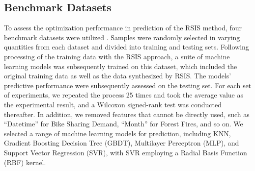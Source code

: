 \documentclass[lettersize,journal]{IEEEtran}
\begin{document}
\subsection{Benchmark Datasets}
To assess the optimization performance in prediction of the RSIS 
method, four benchmark datasets were utilized \cite{bib84,bib85,bib86,bib87}. Samples 
were randomly selected in varying quantities from each dataset 
and divided into training and testing sets. Following 
processing of the training data with the RSIS approach, a 
suite of machine learning models was subsequently trained on 
this dataset, which included the original training data as well 
as the data synthesized by RSIS. The models' predictive performance were subsequently 
assessed on the testing set. For each set of experiments, we 
repeated the process 25 times and took the average value as the 
experimental result, and a Wilcoxon signed-rank test was 
conducted thereafter. In addition, we removed features that 
cannot be directly used, such as “Datetime” for Bike Sharing 
Demand, “Month” for Forest Fires, and so on. We selected a range 
of machine learning models for prediction, including KNN, 
Gradient Boosting Decision Tree (GBDT), Multilayer Perceptron 
(MLP), and Support Vector Regression (SVR), with SVR employing a 
Radial Basis Function (RBF) kernel. 
\end{document}
